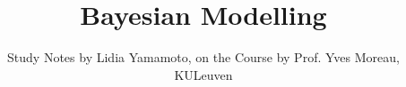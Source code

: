 \documentclass[11pt,a4paper]{article}
\begin{document}

\title{Bayesian Modelling}

\author{Study Notes by Lidia Yamamoto, on the Course by Prof. Yves Moreau, KULeuven}

\maketitle

\tableofcontents
\newpage






\end{document}
